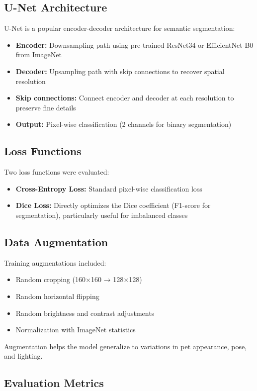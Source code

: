\documentclass[conference]{IEEEtran}
\begin{document}
\subsection{U-Net Architecture}

U-Net is a popular encoder-decoder architecture for semantic segmentation:
\begin{itemize}
\item \textbf{Encoder:} Downsampling path using pre-trained ResNet34 or EfficientNet-B0 from ImageNet
\item \textbf{Decoder:} Upsampling path with skip connections to recover spatial resolution
\item \textbf{Skip connections:} Connect encoder and decoder at each resolution to preserve fine details
\item \textbf{Output:} Pixel-wise classification (2 channels for binary segmentation)
\end{itemize}

\subsection{Loss Functions}

Two loss functions were evaluated:
\begin{itemize}
\item \textbf{Cross-Entropy Loss:} Standard pixel-wise classification loss
\item \textbf{Dice Loss:} Directly optimizes the Dice coefficient (F1-score for segmentation), particularly useful for imbalanced classes
\end{itemize}

\subsection{Data Augmentation}

Training augmentations included:
\begin{itemize}
\item Random cropping (160×160 → 128×128)
\item Random horizontal flipping
\item Random brightness and contrast adjustments
\item Normalization with ImageNet statistics
\end{itemize}

Augmentation helps the model generalize to variations in pet appearance, pose, and lighting.

\subsection{Evaluation Metrics}
\end{document}
